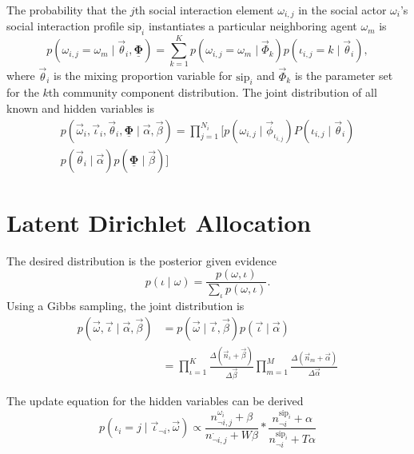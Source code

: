 \documentclass[letterpaper]{article}
\begin{document}
The probability that the $ j $th social interaction element $ \omega_{i,j} $ in the social actor $ \omega_{i} $'s social interaction profile $ \mbox{sip}_{i} $ instantiates a particular neighboring agent $ \omega_{m} $ is
\begin{equation}
p( \omega_{i,j} = \omega_{m} \mid \vec{\theta}_{i} , \underline{\mathbf{\Phi}} ) = \sum_{k=1}^{K} p( \omega_{i,j} = \omega_{m} \mid \vec{\Phi}_{k} ) p( \iota_{i,j} = k \mid \vec{\theta}_{i} ),
\end{equation}
where $ \vec{\theta}_{i} $ is the mixing proportion variable for $ \mbox{sip}_{i} $ and $ \vec{\Phi}_{k} $ is the parameter set for the $ k $th community component distribution.
The joint distribution of all known and hidden variables is
\begin{equation}
\begin{aligned}
p( \vec{\omega}_{i} , \vec{\iota}_{i}, \vec{\theta}_{i} , \underline{\mathbf{\Phi}}  \mid \vec{\alpha} , \vec{\beta} ) = \prod_{j=1}^{N_{i}} 
[ 
p( \omega_{i,j} \mid \vec{\phi}_{\iota_{i,j}} ) P( \iota_{i,j} \mid \vec{\theta}_{i} ) \\
p( \vec{\theta}_{i} \mid \vec{\alpha} ) p( \underline{\mathbf{\Phi}} \mid \vec{\beta} )
]
\end{aligned}
\end{equation}

\section{Latent Dirichlet Allocation}

The desired distribution is the posterior given evidence
\begin{equation}
p( \iota \mid \omega ) = \frac{ p( \omega , \iota ) }{ \sum_{ \iota } p( \omega , \iota ) }.
\end{equation}
Using a Gibbs sampling, the joint distribution is
\begin{equation}
\begin{aligned}
p( \vec{\omega}, \vec{\iota} \mid \vec{\alpha}, \vec{\beta} )  & = p( \vec{\omega} \mid \vec{\iota}, \vec{\beta} ) p( \vec{\iota} \mid \vec{\alpha} ) \\
& = \prod_{\iota = 1}^{K} \frac{\Delta(\vec{n}_{\iota}+\vec{\beta})}{\Delta{\vec{\beta}}}
\prod_{m=1}^{M} \frac{\Delta(\vec{n}_{m}+\vec{\alpha})}{\Delta{\vec{\alpha}}}
\end{aligned}
\end{equation}

The update equation for the hidden variables can be derived
\begin{equation}
p( \iota_{i} = j \mid \vec{\iota}_{\neg i}, \vec{\omega}) \propto 
\frac{ n^{\omega_{i}}_{\neg i, j}+\beta }{ n^{\cdot}_{\neg i, j}+W\beta } \ast \frac{ n^{\mbox{sip}_{i}}_{\neg i}+\alpha }{ n^{\mbox{sip}_{i}}_{\neg i}+T\alpha }
\end{equation}
\end{document}
